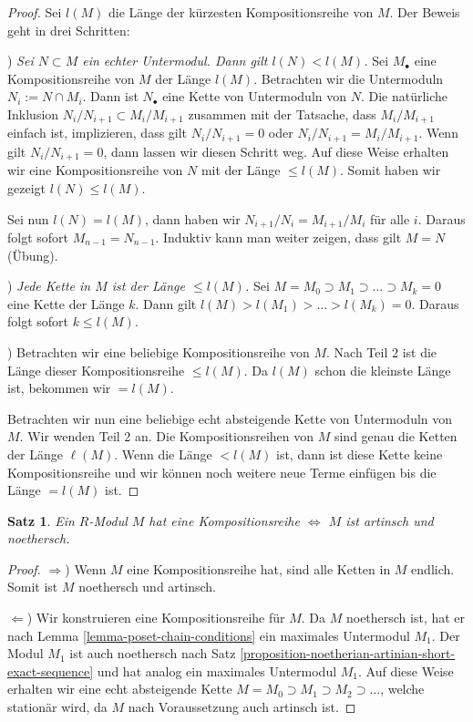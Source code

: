 \documentclass[reqno,12pt]{article}
\numberwithin{equation}{section}
\theoremstyle{plain}
\newtheorem{proposition}[thm]{Satz}
\theoremstyle{definition}
\begin{document}
\begin{proof}
Sei $l(M)$ die Länge der kürzesten Kompositionsreihe von $M$. Der Beweis geht in drei Schritten:

\medskip

)  {\it Sei $N \subset M$ ein echter Untermodul. Dann gilt $l(N) < l(M)$.}  Sei $M_{\bullet}$ eine Kompositionsreihe von $M$ der Länge $l(M)$. Betrachten wir die Untermoduln $N_i := N \cap M_i$. Dann ist $N_{\bullet}$ eine Kette von Untermoduln von $N$. Die natürliche Inklusion $N_i/N_{i+1} \subset M_i/M_{i+1}$ zusammen mit der Tatsache, dass $M_i/M_{i+1}$ einfach ist, implizieren, dass gilt $N_i/N_{i+1} = 0$ oder $N_i/N_{i+1} = M_i/M_{i+1}$. Wenn gilt $N_i/N_{i+1} = 0$, dann lassen wir diesen Schritt weg. Auf diese Weise erhalten wir eine Kompositionsreihe von $N$ mit der Länge $\leq l(M)$. Somit haben wir gezeigt $l(N) \leq l(M)$.

Sei nun $l(N)=l(M)$, dann haben wir $N_{i+1}/N_i = M_{i+1}/M_i$ für alle $i$. Daraus folgt sofort $M_{n-1} = N_{n-1}$. Induktiv kann man weiter zeigen, dass gilt $M=N$ (Übung).


\medskip

)  {\it Jede Kette in $M$ ist der Länge $\leq l(M)$.}  Sei $M = M_0 \supset M_1 \supset \dots \supset M_k=0$ eine Kette der Länge $k$. Dann gilt $l(M) > l(M_1) > \dots > l(M_k) = 0$. Daraus folgt sofort $k \leq l(M)$.


\medskip

) Betrachten wir eine beliebige Kompositionsreihe von $M$. Nach Teil 2 ist die Länge dieser Kompositionsreihe $\leq l(M)$. Da $l(M)$ schon die kleinste Länge ist, bekommen wir $= l(M)$.

\smallskip

Betrachten wir nun eine beliebige echt absteigende Kette von Untermoduln von $M$. Wir wenden Teil 2 an. Die Kompositionsreihen von $M$ sind genau die Ketten der Länge $\ell(M)$. Wenn die Länge $< l(M)$ ist, dann ist diese Kette keine Kompositionsreihe und wir können noch weitere neue Terme einfügen bis die Länge $= l(M)$ ist.
\end{proof}


\begin{proposition}\label{proposition-composition-series-existence}
Ein $R$-Modul $M$ hat eine Kompositionsreihe $\iff$ $M$ ist artinsch und noethersch.
\end{proposition}

\begin{proof}
$\Rightarrow$) Wenn $M$ eine Kompositionsreihe hat, sind alle Ketten in $M$ endlich. Somit ist $M$ noethersch und artinsch.

\smallskip

$\Leftarrow$) Wir konstruieren eine Kompositionsreihe für $M$. Da $M$ noethersch ist, hat er nach Lemma \ref{lemma-poset-chain-conditions} ein maximales Untermodul $M_1$. Der Modul $M_1$ ist auch noethersch nach Satz \ref{proposition-noetherian-artinian-short-exact-sequence} und hat analog ein maximales Untermodul $M_1$. Auf diese Weise erhalten wir eine echt absteigende Kette $M=M_0 \supset M_1 \supset M_2 \supset \dots$, welche stationär wird, da $M$ nach Voraussetzung auch artinsch ist.
\end{proof}
\end{document}
